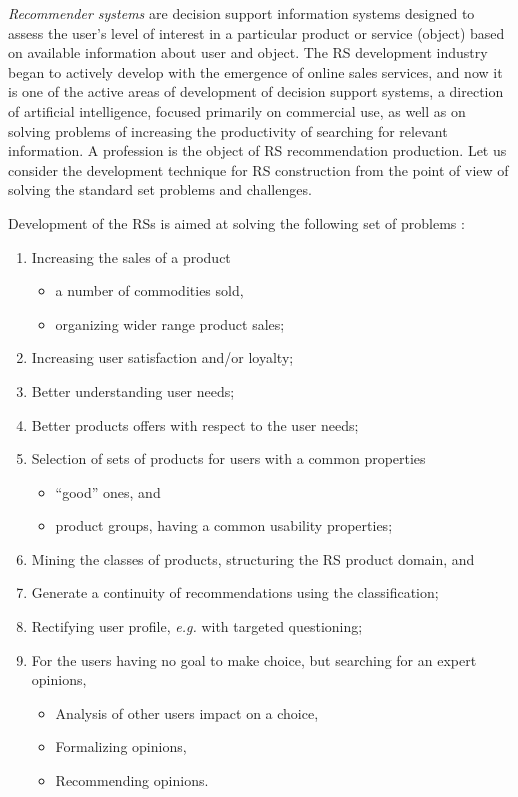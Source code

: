 \documentclass[conference,a4]{IEEEtran}
\begin{document}
\emph{Recommender systems} \cite{rs_basics} are decision support information systems designed to assess the user's level of interest in a particular product or service (object) based on available information about user and object.  The RS development industry began to actively develop with the emergence of online sales services, and now it is one of the active areas of development of decision support systems, a direction of artificial intelligence, focused primarily on commercial use, as well as on solving problems of increasing the productivity of searching for relevant information.  A profession is the object of RS recommendation production.  Let us consider the development technique for RS construction from the point of view of solving the standard set problems and challenges.

Development of the RSs is aimed at solving the following set of problems \cite{ricci}:
\begin{enumerate}
\item Increasing the sales of a product
  \begin{itemize}
  \item a number of commodities sold,
  \item organizing wider range product sales;
  \end{itemize}
\item Increasing user satisfaction and/or loyalty;
\item Better understanding user needs;
\item Better products offers with respect to the user needs;
\item Selection of sets of products for users with a common properties
  \begin{itemize}
  \item ``good'' ones, and
  \item product groups, having a common usability properties;
  \end{itemize}
\item Mining the classes of products, structuring the RS product domain, and
\item Generate a continuity of recommendations using the classification;
\item Rectifying user profile, \emph{e.g.} with targeted questioning;
\item For the users having no goal to make choice, but searching for an expert opinions,
  \begin{itemize}
  \item Analysis of other users impact on a choice,
  \item Formalizing opinions,
  \item Recommending opinions.
  \end{itemize}
\end{enumerate}
\end{document}
